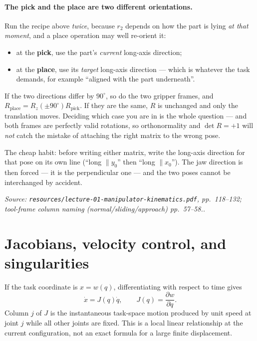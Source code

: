 \documentclass[11pt,a4paper]{article}
\renewcommand{\texttt}[1]{\nolinkurl{#1}}
\newcommand{\source}[1]{\par\smallskip\noindent\textit{Source: #1.}\par\smallskip}
\begin{document}
\paragraph{The pick and the place are two different orientations.}
Run the recipe above \emph{twice}, because $r_2$ depends on how the part is lying \emph{at that
moment}, and a place operation may well re-orient it:
\begin{itemize}
\item at the \textbf{pick}, use the part's \emph{current} long-axis direction;
\item at the \textbf{place}, use its \emph{target} long-axis direction --- which is whatever the task
      demands, for example ``aligned with the part underneath''.
\end{itemize}
If the two directions differ by $90^\circ$, so do the two gripper frames, and
$R_{\text{place}}=R_z(\pm90^\circ)R_{\text{pick}}$. If they are the same, $R$ is unchanged and only
the translation moves. Deciding which case you are in is the whole question --- and both frames are
perfectly valid rotations, so orthonormality and $\det R=+1$ will \emph{not} catch the mistake of
attaching the right matrix to the wrong pose.

The cheap habit: before writing either matrix, write the long-axis direction for that pose on its own
line (``long $\parallel y_0$'' then ``long $\parallel x_0$''). The jaw direction is then forced --- it
is the perpendicular one --- and the two poses cannot be interchanged by accident.
\source{\texttt{resources/lecture-01-manipulator-kinematics.pdf}, pp.~118--132; tool-frame column
naming (normal/sliding/approach) pp.~57--58.}

\section{\enspace Jacobians, velocity control, and singularities}
If the task coordinate is $x=w(q)$, differentiating with respect to time gives
\[
 \dot x=J(q)\dot q,
 \qquad J(q)=\frac{\partial w}{\partial q}.
\]
Column $j$ of $J$ is the instantaneous task-space motion produced by unit speed at joint $j$ while all other joints are fixed. This is a local linear relationship at the current configuration, not an exact formula for a large finite displacement.
\end{document}
